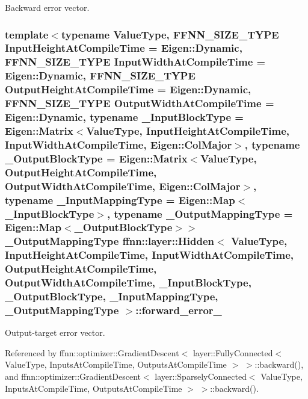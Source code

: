 Backward error vector. 

\hypertarget{classffnn_1_1layer_1_1_hidden_ae1671dbf7f91d9ae21d307761c0e930e}{
\subsubsection[{forward\-\_\-error\-\_\-}]{\setlength{\rightskip}{0pt plus 5cm}template$<$typename Value\-Type, F\-F\-N\-N\-\_\-\-S\-I\-Z\-E\-\_\-\-T\-Y\-P\-E Input\-Height\-At\-Compile\-Time = Eigen\-::\-Dynamic, F\-F\-N\-N\-\_\-\-S\-I\-Z\-E\-\_\-\-T\-Y\-P\-E Input\-Width\-At\-Compile\-Time = Eigen\-::\-Dynamic, F\-F\-N\-N\-\_\-\-S\-I\-Z\-E\-\_\-\-T\-Y\-P\-E Output\-Height\-At\-Compile\-Time = Eigen\-::\-Dynamic, F\-F\-N\-N\-\_\-\-S\-I\-Z\-E\-\_\-\-T\-Y\-P\-E Output\-Width\-At\-Compile\-Time = Eigen\-::\-Dynamic, typename \-\_\-\-Input\-Block\-Type = Eigen\-::\-Matrix$<$\-Value\-Type, Input\-Height\-At\-Compile\-Time, Input\-Width\-At\-Compile\-Time, Eigen\-::\-Col\-Major$>$, typename \-\_\-\-Output\-Block\-Type = Eigen\-::\-Matrix$<$\-Value\-Type, Output\-Height\-At\-Compile\-Time, Output\-Width\-At\-Compile\-Time, Eigen\-::\-Col\-Major$>$, typename \-\_\-\-Input\-Mapping\-Type = Eigen\-::\-Map$<$\-\_\-\-Input\-Block\-Type$>$, typename \-\_\-\-Output\-Mapping\-Type = Eigen\-::\-Map$<$\-\_\-\-Output\-Block\-Type$>$$>$ \-\_\-\-Output\-Mapping\-Type {\bf ffnn\-::layer\-::\-Hidden}$<$ Value\-Type, Input\-Height\-At\-Compile\-Time, Input\-Width\-At\-Compile\-Time, Output\-Height\-At\-Compile\-Time, Output\-Width\-At\-Compile\-Time, \-\_\-\-Input\-Block\-Type, \-\_\-\-Output\-Block\-Type, \-\_\-\-Input\-Mapping\-Type, \-\_\-\-Output\-Mapping\-Type $>$\-::forward\-\_\-error\-\_\-\hspace{0.3cm}{\ttfamily [protected]}}}\label{classffnn_1_1layer_1_1_hidden_ae1671dbf7f91d9ae21d307761c0e930e}


Output-\/target error vector. 



Referenced by ffnn\-::optimizer\-::\-Gradient\-Descent$<$ layer\-::\-Fully\-Connected$<$ Value\-Type, Inputs\-At\-Compile\-Time, Outputs\-At\-Compile\-Time $>$ $>$\-::backward(), and ffnn\-::optimizer\-::\-Gradient\-Descent$<$ layer\-::\-Sparsely\-Connected$<$ Value\-Type, Inputs\-At\-Compile\-Time, Outputs\-At\-Compile\-Time $>$ $>$\-::backward().


